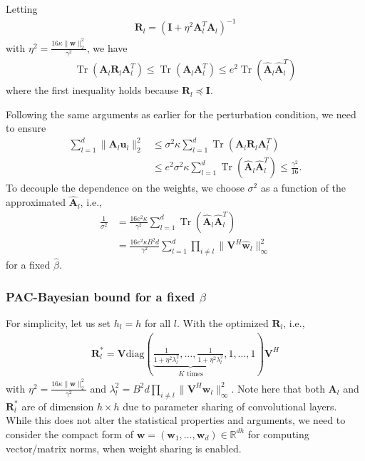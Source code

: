 \documentclass[journal]{IEEEtran} %
\def\vu{{\bm{u}}}
\def\vw{{\bm{w}}}
\def\mA{{\bm{A}}}
\def\mI{{\bm{I}}}
\def\mR{{\bm{R}}}
\def\mV{{\bm{V}}}
\newcommand{\R}{\mathbb{R}}
\newcommand{\Norm}[1]{\|#1\|}
\DeclareMathOperator{\Tr}{Tr}
\begin{document}
Letting
\begin{align} 
    {\mR}_l  = (\mI+\eta^2 \mA_{l}^T \mA_{l} )^{-1}
\end{align}
with $\eta^2=\frac{16   \kappa \Norm{\vw}_2^2}{\gamma^2}$, we have
\begin{align}
    \Tr({\mA}_l {\mR}_l {\mA}_l^T) \le \Tr({\mA}_l {\mA}_l^T) \le e^2\Tr(\hat{\mA}_l \hat{\mA}_l^T)
\end{align}
where the first inequality holds because $\mR_l \preceq \mI$.

Following the same arguments as earlier for the perturbation condition, we need to ensure
\begin{align}
   \sum_{l=1}^d \Norm{{\mA}_l \vu_l}_2^2 &\le \sigma^2 \kappa \sum_{l=1}^d \Tr({\mA}_l {\mR}_l {\mA}_l^T)\\
   &\le e^2 \sigma^2 \kappa \sum_{l=1}^d \Tr(\hat{\mA}_l \hat{\mA}_l^T)
   \le  \frac{\gamma^2}{16}.
\end{align}
To decouple the dependence on the weights, we choose $\sigma^2$ as a function of the approximated $\hat{\mA}_l$, i.e.,
\begin{align}
    \frac{1}{\sigma^2} &= \frac{16e^2 \kappa}{\gamma^2} \sum_{l=1}^d \Tr(\hat{\mA}_l  \hat{\mA}_l^T)\\
    &= \frac{16e^2 \kappa B^2 d}{\gamma^2} \sum_{l=1}^d  \prod_{i\ne l} \Norm{\mV^H \hat{\vw}_l}_{\infty}^2 \label{eq:sigma-upper-circ}
\end{align}
for a fixed $\hat{\beta}$.

\subsubsection{PAC-Bayesian bound for a fixed $\beta$}
For simplicity, let us set $h_l=h$ for all $l$. 
With the optimized $\mR_l$, i.e.,
\begin{align}
    \mR_l^* =  \mV \mathrm{diag}(\underbrace{\frac{1}{1 + \eta^2 \lambda_l^2}, \dots, \frac{1}{1 + \eta^2 \lambda_l^2},}_{K \text{ times}} 1,\dots,1 ) \mV^H
    \label{eq:low-rank-Rl}
\end{align}
with ${\eta}^2=\frac{16 \kappa \Norm{\vw}_2^2}{\gamma^2}$ and $\lambda_l^2=B^2 d \prod_{i\ne l} \Norm{\mV^H \vw_l}_{\infty}^2$. 
Note here that both $\mA_l$ and $\mR_l^*$ are of dimension $h \times h$ due to parameter sharing of convolutional layers. While this does not alter the statistical properties and arguments, we need to consider the compact form of $\vw=(\vw_1,\dots,\vw_d) \in \R^{dh}$ for computing vector/matrix norms, when weight sharing is enabled.
\end{document}
